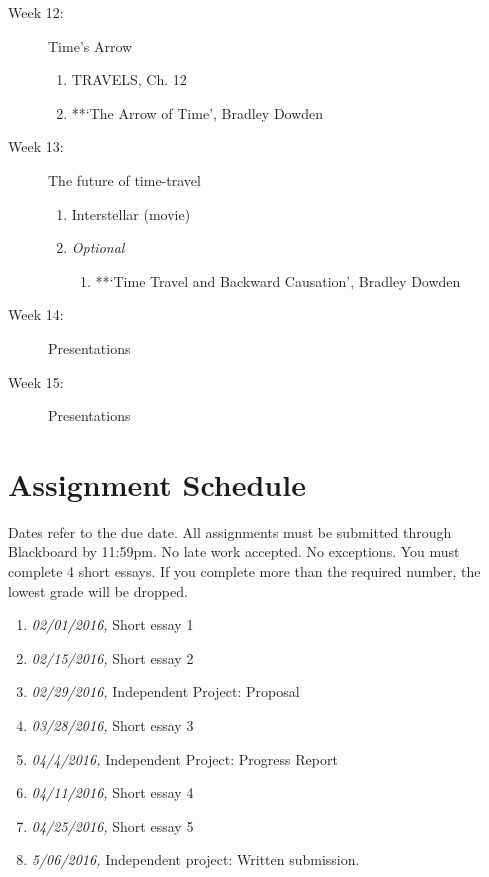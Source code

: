 \documentclass[article,oneside]{memoir}
\begin{document}
\begin{description}
\item[Week 12:] Time's Arrow
\begin{enumerate}
\item TRAVELS, Ch. 12
\item **`The Arrow of Time', Bradley Dowden
\end{enumerate}


\item[Week 13:]  The future of time-travel
\begin{enumerate}
\item Interstellar (movie)
\item \emph{Optional}
\begin{enumerate}
\item **`Time Travel and Backward Causation', Bradley Dowden
\end{enumerate}
\end{enumerate}

\item[Week 14:] Presentations




\item[Week 15:] Presentations
 \end{description}

\section{ Assignment Schedule}
Dates refer to the due date. All assignments must be submitted through Blackboard by 11:59pm. No late work accepted. No exceptions. You must complete 4 short essays. If you complete more than the required number, the lowest grade will be dropped.
\begin{enumerate}
\item \textit{02/01/2016,} Short essay 1
\item \textit{02/15/2016,} Short essay 2
\item \textit{02/29/2016,} Independent Project: Proposal
\item \textit{03/28/2016,} Short essay 3
\item \textit{04/4/2016,} Independent Project: Progress Report
\item \textit{04/11/2016,} Short essay 4
\item \textit{04/25/2016,} Short essay 5
\item \textit{5/06/2016,} Independent project: Written submission.
\end{enumerate}




\end{document}
